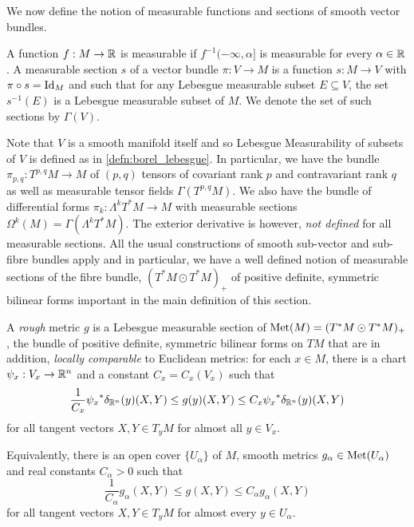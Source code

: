 \documentclass[a4paper, 12pt]{amsart}
\begin{document}
We now define the notion of measurable functions and sections of smooth vector bundles.

\begin{defn}
A function $f: M \to \mathbb{R}$ is measurable if $f^{-1}(-\infty, \alpha]$ is measurable for every $\alpha  \in \mathbb{R}$. A measurable section \(s\) of a vector bundle \(\pi : V \to M\) is a function \(s: M \to V\) with \(\pi \circ s = \operatorname{Id}_M\) and such that for any Lebesgue measurable subset \(E \subseteq V\), the set \(s^{-1}(E)\) is a Lebesgue measurable subset of \(M\).  We denote the set of such sections by $\Gamma(V)$.
\end{defn}

Note that \(V\) is a smooth manifold itself and so Lebesgue Measurability of subsets of \(V\) is defined as in \ref{defn:borel_lebesgue}. In particular, we have the bundle $\pi_{p,q} : T^{p,q}M \to M$ of $(p,q)$ tensors of covariant rank $p$ and contravariant rank $q$ as well as measurable tensor fields \(\Gamma(T^{p,q}M)\). We also have the bundle of differential forms \(\pi_k : \Lambda^k T^{\ast} M \to M\) with measurable sections \(\Omega^k(M) = \Gamma(\Lambda^k T^{\ast} M)\). The exterior derivative is however, \emph{not defined} for all measurable sections. All the usual constructions of smooth sub-vector and sub-fibre bundles apply and in particular, we have a well defined notion of measurable sections of the fibre bundle, \((T^{\ast} M \odot T^{\ast} M)_+\) of positive definite, symmetric bilinear forms important in the main definition of this section.

\begin{defn}
\label{defn:rough_metric}
A \emph{rough} metric \(g\) is a Lebesgue measurable section of \(\operatorname{Met}(M) = (T^{\ast} M \odot T^{\ast} M)_+\), the bundle of positive definite, symmetric bilinear forms on \(TM\) that are in addition, \emph{locally comparable} to Euclidean metrics:
for each $x \in M$, there is a chart $\psi_x:V_x \to \mathbb{R}^n$ and a constant $C_x = C_x(V_x)$ such that
\[
\frac{1}{C_{x}} {\psi_x}^\ast\delta_{\mathbb{R}^n}(y) (X, Y) \leq g(y)(X, Y) \leq C_{x} {\psi_x}^\ast\delta_{\mathbb{R}^n}(y) (X, Y)
\]
for all tangent vectors \(X, Y \in T_yM\) for almost all $y \in V_x$. 
\end{defn}

\begin{rem}
Equivalently, there is an open cover \(\lbrace U_{\alpha} \rbrace\) of \(M\), smooth metrics \(g_{\alpha} \in \operatorname{Met}(U_{\alpha})\) and real constants \(C_{\alpha} > 0\) such that
\[
\frac{1}{C_{\alpha}} g_{\alpha} (X, Y) \leq g(X, Y) \leq C_{\alpha} g_{\alpha} (X, Y)
\]
for all tangent vectors \(X, Y \in T_yM\) for almost every $y \in U_\alpha$.
\end{rem}
\end{document}
